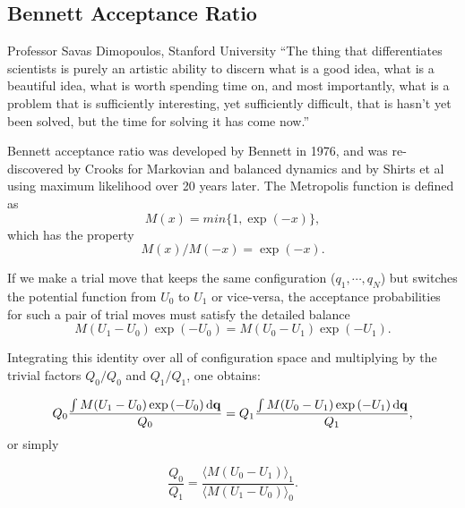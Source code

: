 \subsection{Bennett Acceptance Ratio\label{Sec:FEM:BAR}}
\begin{chapquote}{Professor Savas Dimopoulos, Stanford University}
	``The thing that differentiates scientists is purely an artistic ability to discern what is a good idea, what is a beautiful idea, what is worth spending time on, and most importantly, what is a problem that is sufficiently interesting, yet sufficiently difficult, that is hasn't yet been solved, but the time for solving it has come now.''
\end{chapquote}
Bennett acceptance ratio was developed by Bennett in 1976,\cite{BennettJComputPhys1976} and was re-discovered by Crooks\cite{CrooksPRE2000} for Markovian and balanced dynamics and by Shirts et al\cite{ShirtsPRL2003} using maximum likelihood over 20 years later. The Metropolis function is defined as
\begin{equation}
	M(x)=min\{1,\exp{(-x)}\},
\end{equation}
which has the property 
\begin{equation}
	M(x)/M(-x)=\exp{(-x)}.
\end{equation}

If we make a trial move that keeps the same configuration ($q_{1},\cdots,q_{N}$)
but switches the potential function from $U_{0}$ to $U_{1}$ or vice-versa, 
the acceptance probabilities for such a pair of trial moves must satisfy
the detailed balance
\begin{equation}
	M(U_{1}-U_{0})\exp{(-U_{0})}=M(U_{0}-U_{1})\exp{(-U_{1})}.
\end{equation}

Integrating this identity over all of configuration space and multiplying
by the trivial factors $Q_{0}/Q_{0}$ and $Q_{1}/Q_{1}$, one obtains:

\begin{equation}
	Q_{0}\frac{\int M(U_{1}-U_{0})\exp{(-U_{0})}\mathop{}\!\mathrm{d}\mathbf{{q}}}{Q_{0}}=Q_{1}\frac{\int M(U_{0}-U_{1})\exp{(-U_{1})}\mathop{}\!\mathrm{d}\mathbf{{q}}}{Q_{1}},
\end{equation}
or simply

\begin{equation}
	\frac{Q_{0}}{Q_{1}}=\frac{\langle M(U_{0}-U_{1})\rangle_{1}}{\langle M(U_{1}-U_{0})\rangle_{0}}.\label{eq:FEM:BAR:MetropolisRatio}
\end{equation}

